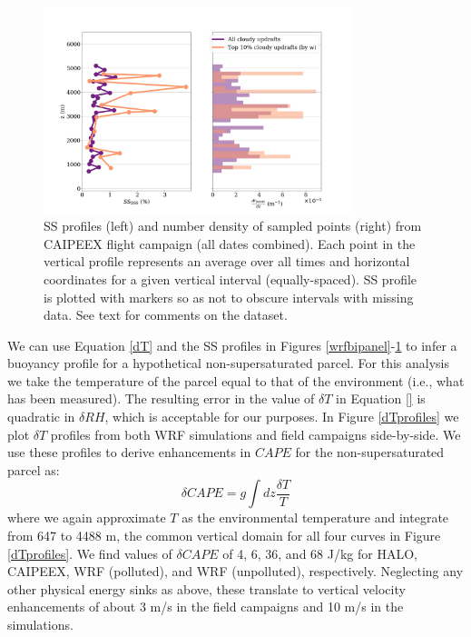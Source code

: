 \documentclass{article}
\begin{document}
\begin{figure}[ht]
    \centering
    \includegraphics[width=9cm]{revcaipeex/v3_FINAL_combined_bipanel_ss_qss_vs_z_figure.png}
    \caption{SS profiles (left) and number density of sampled points (right) from CAIPEEX flight campaign (all dates combined). Each point in the vertical profile represents an average over all times and horizontal coordinates for a given vertical interval (equally-spaced). SS profile is plotted with markers so as not to obscure intervals with missing data. See text for comments on the dataset.}
    \label{caipeexbipanel}
\end{figure}

We can use Equation \ref{dT} and the SS profiles in Figures \ref{wrfbipanel}-\ref{caipeexbipanel} to infer a buoyancy profile for a hypothetical non-supersaturated parcel. For this analysis we take the temperature of the parcel equal to that of the environment (i.e., what has been measured). The resulting error in the value of $\delta T$ in Equation \ref{} is quadratic in $\delta RH$, which is acceptable for our purposes. In Figure \ref{dTprofiles} we plot $\delta T$ profiles from both WRF simulations and field campaigns side-by-side. We use these profiles to derive enhancements in $CAPE$ for the non-supersaturated parcel as:
\begin{equation}
\label{dCAPE}
\delta CAPE = g \int dz \frac{\delta T}{T}
\end{equation}
where we again approximate $T$ as the environmental temperature and integrate from 647 to 4488 m, the common vertical domain for all four curves in Figure \ref{dTprofiles}. We find values of $\delta CAPE$ of 4, 6, 36, and 68 J/kg for HALO, CAIPEEX, WRF (polluted), and WRF (unpolluted), respectively. Neglecting any other physical energy sinks as above, these translate to vertical velocity enhancements of about 3 m/s in the field campaigns and 10 m/s in the simulations.
\end{document}
